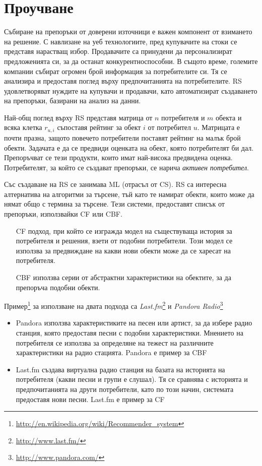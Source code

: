 \section{Проучване}

	Събиране на препоръки от доверени източници е важен компонент от взимането на решение. С навлизане на уеб технологиите, пред купувачите на стоки се представя нарастващ избор. Продавачите са принудени да персонализират предложенията си, за да останат конкурентноспособни. В същото време, големите компании събират огромен брой информация за потребителите си. Тя се анализира и предоставя поглед върху предпочитанията на потребителите. \ac{RS} удовлетворяват нуждите на купувачи и продавачи, като автоматизират създаването на препоръки, базирани на анализ на данни.
	
	Най-общ поглед върху \ac{RS} представя матрица от $n$ потребителя и $m$ обекта и всяка клетка $r_{u,i}$ съпоставя рейтинг за обект $i$ от потребител $u$. Матрицата е почти празна, защото повечето потребители поставят рейтинг на малък брой обекти. Задачата е да се предвиди оценката на обект, която потребителят би дал. Препоръчват се тези продукти, които имат най-висока предвидена оценка. Потребителят, за който се създават препоръки, се нарича \emph{активен потребител}.

	Със създаване на \ac{RS} се занимава \ac{ML} (отрасъл от \ac{CS}). \ac{RS} са интересна алтернатива на алгоритми за търсене, тъй като те намират обекти, които може да нямат общо с термина за търсене. Тези системи, предоставят списък от препоръки, използвайки \ac{CF} или \ac{CBF}. 
	
	\begin{itemize}
		\item[\ac{CF}] подход, при който се изгражда модел на съществуваща история за потребителя и решения, взети от подобни потребители.
	Този модел се използва за предвиждане на какви нови обекти може да се харесат на потребителя.\cite{Melville}
		\item[\ac{CBF}] използва серии от абстрактни характеристики на обектите, за да препоръча подобни обекти.\cite{Mooney}
	\end{itemize}
	
	Пример\footnote{\url{http://en.wikipedia.org/wiki/Recommender_system}} за използване на двата подхода са 
  \emph{Last.fm}\footnote{\url{http://www.last.fm/}} и \emph{Pandora Radio}\footnote{\url{http://www.pandora.com/}}
  
  \begin{itemize}
		\item Pandora използва характеристиките на песен или артист, за да избере радио станция, която предоставя песни с подобни характеристики. Мнението на потребителя се използва за определяне на тежест на различните характеристики на радио стацията. Pandora е пример за \ac{CBF}
		\item Last.fm създава виртуална радио станция на базата на историята на потребителя (какви песни и групи е слушал). Тя се сравнява с историята и предпочитанията на други потребители, като по този начин, системата предоставя нови песни. Last.fm е пример за \ac{CF}
  \end{itemize}

